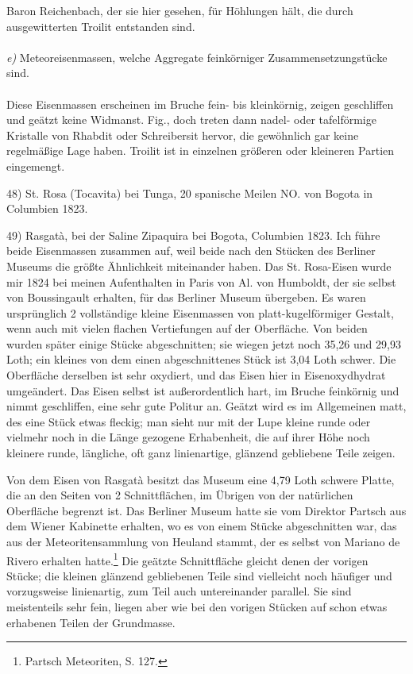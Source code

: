 \documentclass[a4paper, 11pt, oneside]{article}
\begin{document}
Baron Reichenbach, der sie hier gesehen, für Höhlungen hält, die durch ausgewitterten Troilit entstanden sind.
\vspace{\medskipamount}
\paragraph{}
\emph{e)} Meteoreisenmassen, welche Aggregate feinkörniger Zusammensetzungstücke sind.
\vspace{\medskipamount}
\paragraph{}
Diese Eisenmassen erscheinen im Bruche fein- bis kleinkörnig, zeigen geschliffen und geätzt keine Widmanst. Fig., doch treten dann nadel- oder tafelförmige Kristalle von Rhabdit oder Schreibersit hervor, die gewöhnlich gar keine regelmäßige Lage haben. Troilit ist in einzelnen größeren oder kleineren Partien eingemengt.

48) St. Rosa (Tocavita) bei Tunga, 20 spanische Meilen NO. von Bogota in Columbien 1823.

49) Rasgatà, bei der Saline Zipaquira bei Bogota, Columbien 1823. Ich führe beide Eisenmassen zusammen auf, weil beide nach den Stücken des Berliner Museums die größte Ähnlichkeit miteinander haben. Das St. Rosa-Eisen wurde mir 1824 bei meinen Aufenthalten in Paris von Al. von Humboldt, der sie selbst von Boussingault erhalten, für das Berliner Museum übergeben. Es waren ursprünglich 2 vollständige kleine Eisenmassen von platt-kugelförmiger Gestalt, wenn auch mit vielen flachen Vertiefungen auf der Oberfläche. Von beiden wurden später einige Stücke abgeschnitten; sie wiegen jetzt noch 35,26 und 29,93 Loth; ein kleines von dem einen abgeschnittenes Stück ist 3,04 Loth schwer. Die Oberfläche derselben ist sehr oxydiert, und das Eisen hier in Eisenoxydhydrat umgeändert. Das Eisen selbst ist außerordentlich hart, im Bruche feinkörnig und nimmt geschliffen, eine sehr gute Politur an. Geätzt wird es im Allgemeinen matt, des eine Stück etwas fleckig; man sieht nur mit der Lupe kleine runde oder vielmehr noch in die Länge gezogene Erhabenheit, die auf ihrer Höhe noch kleinere runde, längliche, oft ganz linienartige, glänzend gebliebene Teile zeigen.

Von dem Eisen von Rasgatà besitzt das Museum eine 4,79 Loth schwere Platte, die an den Seiten von 2 Schnittflächen, im Übrigen von der natürlichen Oberfläche begrenzt ist. Das Berliner Museum hatte sie vom Direktor Partsch aus dem Wiener Kabinette erhalten, wo es von einem Stücke abgeschnitten war, das aus der Meteoritensammlung von Heuland stammt, der es selbst von Mariano de Rivero erhalten hatte.\footnote{Partsch Meteoriten, S. 127.} Die geätzte Schnittfläche gleicht denen der vorigen Stücke; die kleinen glänzend gebliebenen Teile sind vielleicht noch häufiger und vorzugsweise linienartig, zum Teil auch untereinander parallel. Sie sind meistenteils sehr fein, liegen aber wie bei den vorigen Stücken auf schon etwas erhabenen Teilen der Grundmasse.
\end{document}
